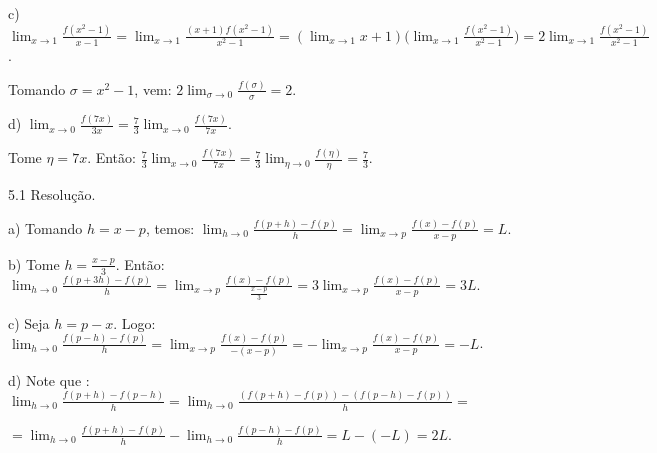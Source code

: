 \documentclass{article}
\begin{document}
{\begin{newpage}
\par
\vspace{0.3cm}
c) $\displaystyle{\lim_{x\to 1} \frac{f(x^2 - 1)}{x-1} = \lim_{x\to 1} \frac{(x+1)f(x^2 - 1)}{x^2 - 1} = (\lim_{x\to 1} x+1)\Big(\lim_{x\to 1} \frac{f(x^2 - 1)}{x^2 - 1}\Big) = 2 \lim_{x\to 1} \frac{f(x^2 - 1)}{x^2 - 1}}$.
\par Tomando $\sigma = x^2 - 1$, vem: $2 \displaystyle{\lim_{\sigma \to 0} \frac{f(\sigma)}{\sigma} = 2}$.
\par
\vspace{0.3cm}
d) $\displaystyle{\lim_{x\to 0} \frac{f(7x)}{3x} = \frac{7}{3} \lim_{x\to 0} \frac{f(7x)}{7x}}$.
\par
Tome $\eta = 7x$. Então: $\displaystyle{\frac{7}{3} \lim_{x\to 0} \frac{f(7x)}{7x} = \frac{7}{3}\lim_{\eta \to 0} \frac{f(\eta)}{\eta } =\frac{7}{3}}$.
\par
\vspace{0.3cm}
\begin{flushleft}
5.1 Resolução.
\end{flushleft}
\par
a) Tomando $h = x - p$, temos: $\displaystyle{\lim_{h\to 0} \frac{f(p+h) - f(p)}{h} = \lim_{x\to p} \frac{f(x) - f(p)}{x - p} =L}$.
\par
\vspace{0.3cm}
b) Tome $h = \frac{x-p}{3}$. Então: $\displaystyle{\lim_{h\to 0} \frac{f(p+3h) - f(p)}{h} = \lim_{x\to p} \frac{f(x) - f(p)}{\frac{x-p}{3}} = 3\lim_{x\to p} \frac{f(x) - f(p)}{x-p} = 3L}$.
\par
\vspace{0.3cm}
c) Seja $h = p-x$. Logo: $\displaystyle{\lim_{h\to 0} \frac{f(p-h) - f(p)}{h} = \lim_{x \to p} \frac{f(x) - f(p)}{-(x-p)} = -\lim_{x\to p} \frac{f(x) - f(p)}{x-p} = -L}$.
\par
\vspace{0.3cm}
d) Note que : $\displaystyle{\lim_{h\to 0} \frac{f(p+h) - f(p-h)}{h} = \lim_{h\to 0} \frac{(f(p+h) - f(p)) - (f(p-h) - f(p))}{h} =}$\par
$=\displaystyle{\lim_{h\to 0} \frac{f(p+h) - f(p)}{h} - \lim_{h\to 0} \frac{f(p-h) - f(p)}{h} = L - (-L) = 2L}$.
\par
\vspace{0.3cm}

\end{newpage}}
\end{document}
